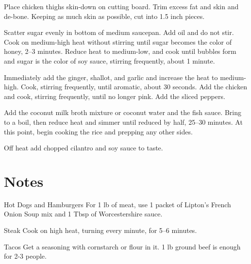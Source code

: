\documentclass[oneside]{book}  %
\def\thisrecipe{}  %
\newcommand{\recipe}[1]{\section{#1}\def\thisrecipe{: #1}} %
\begin{document}
\begin{directions}
  \item Place chicken thighs skin-down on cutting board. Trim excess fat and
    skin and de-bone. Keeping as much skin as possible, cut into 1.5 inch
    pieces.

  \item Scatter sugar evenly in bottom of medium saucepan. Add oil and do not
    stir. Cook on medium-high heat without stirring until sugar becomes the
    color of honey, 2--3 minutes. Reduce heat to medium-low, and cook until
    bubbles form and sugar is the color of soy sauce, stirring frequently, about
    1 minute.

  \item Immediately add the ginger, shallot, and garlic and increase the heat to
    medium-high. Cook, stirring frequently, until aromatic, about 30 seconds.
    Add the chicken and cook, stirring frequently, until no longer pink. Add the
    sliced peppers.

  \columnbreak

  \item Add the coconut milk broth mixture or coconut water and the fish sauce.
    Bring to a boil, then reduce heat and simmer until reduced by half, 25--30
    minutes. At this point, begin cooking the rice and prepping any other sides.

  \item Off heat add chopped cilantro and soy sauce to taste.
\end{directions}
\recipe{Notes} \label{notes:dinners_standalone} %
\begin{kitchennotes}
  \item[Hot Dogs and Hamburgers]  
    For 1 lb of meat, use 1 packet of Lipton's French Onion Soup mix and 1 Tbsp
    of Worcestershire sauce.
  \item[Steak]  
    Cook on high heat, turning every minute, for 5--6 minutes.
  \item[Tacos]  
    Get a seasoning with cornstarch or flour in it. 1 lb ground beef is enough
    for 2-3 people.
\end{kitchennotes}
\end{document}

